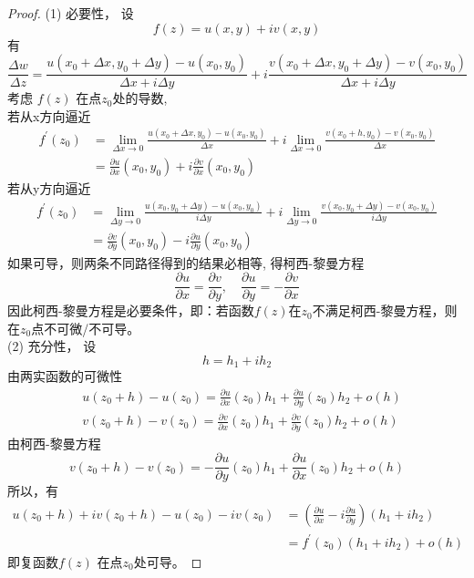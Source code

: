 \begin{proof}
  (1) 必要性， 设 
  \[ f(z) = u(x,y) + iv(x,y)\]
  有
  \[\frac{\Delta w}{\Delta z}=\frac{u\left(x_{0}+\Delta x, y_{0}+\Delta y\right)-u\left(x_{0}, y_{0}\right)}{\Delta x+i \Delta y}+i \frac{v\left(x_{0}+\Delta x, y_{0}+\Delta y\right)-v\left(x_{0}, y_{0}\right)}{\Delta x+i \Delta y}\]
  考虑 $f(z)$ 在点$z_0$处的导数,\\
  若从x方向逼近
  \[ \begin{aligned}
    f^{\prime}\left(z_{0}\right) &=\lim\limits _{\Delta x \rightarrow 0} \frac{u\left(x_{0}+\Delta x, y_{0}\right)-u\left(x_{0}, y_{0}\right)}{\Delta x}+i \lim\limits_{\Delta x \rightarrow 0} \frac{v\left(x_{0}+h, y_{0}\right)-v\left(x_{0}, y_{0}\right)}{\Delta x} \\
    &=\frac{\partial u}{\partial x}\left(x_{0}, y_{0}\right)+i \frac{\partial v}{\partial x}\left(x_{0}, y_{0}\right)
    \end{aligned}\] 
    若从y方向逼近
    \[ \begin{aligned}
      f^{\prime}\left(z_{0}\right) &=\lim\limits _{\Delta y \rightarrow 0} \frac{u\left(x_{0}, y_{0} +\Delta y\right)-u\left(x_{0}, y_{0}\right)}{i \Delta y}+i \lim\limits_{\Delta y \rightarrow 0} \frac{v\left(x_{0}, y_{0}+\Delta y\right)-v\left(x_{0}, y_{0}\right)}{i\Delta y} \\
      &=\frac{\partial v}{\partial y}\left(x_{0}, y_{0}\right)-i \frac{\partial u}{\partial y}\left(x_{0}, y_{0}\right)
      \end{aligned}\] 
    如果可导，则两条不同路径得到的结果必相等, 得柯西-黎曼方程 
    \[ \frac{\partial u}{\partial x } = \frac{\partial v}{\partial y}, \quad \frac{\partial u}{\partial y } = - \frac{\partial v}{\partial x}\]
    因此柯西-黎曼方程是必要条件，即：若函数$f(z)$在$z_0$不满足柯西-黎曼方程，则在$z_0$点不可微/不可导。\\
    (2) 充分性， 设 
    \[ h= h_1 + ih_2\]
    由两实函数的可微性 
    \[
    \begin{aligned}
    & u\left(z_0+h\right)-u\left(z_0\right)=\frac{\partial u}{\partial x}\left(z_0\right) h_1+\frac{\partial u}{\partial y}\left(z_0\right) h_2+o(h) \\
    & v\left(z_0+h\right)-v\left(z_0\right)=\frac{\partial v}{\partial x}\left(z_0\right) h_1+\frac{\partial v}{\partial y}\left(z_0\right) h_2+o(h)
    \end{aligned}
    \]
    由柯西-黎曼方程
    \[v\left(z_0+h\right)-v\left(z_0\right)=-\frac{\partial u}{\partial y}\left(z_0\right) h_1+\frac{\partial u}{\partial x}\left(z_0\right) h_2+o(h)\]
    所以，有
    \[\begin{aligned}
      u\left(z_0+h\right)+i v\left(z_0+h\right)-u\left(z_0\right)-i v\left(z_0\right) &=\left(\frac{\partial u}{\partial x}-i \frac{\partial u}{\partial y}\right)\left(h_1+i h_2\right) \\
      & =f^{\prime}\left(z_0\right)\left(h_1+i h_2\right)+o(h)
    \end{aligned}\]
    即复函数$f(z)$ 在点$z_0$处可导。
\end{proof}

